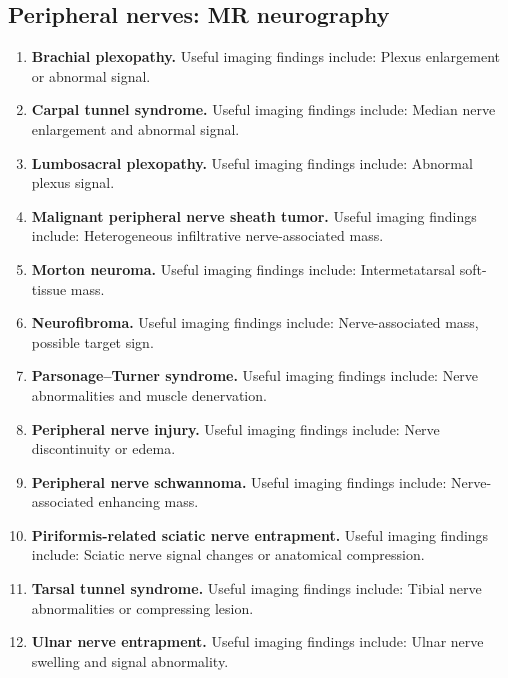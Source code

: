 \subsection{Peripheral nerves: MR neurography}
\begin{enumerate}[leftmargin=*,itemsep=0.45em,topsep=0.4em]
\item \textbf{Brachial plexopathy.} Useful imaging findings include: Plexus enlargement or abnormal signal.
\item \textbf{Carpal tunnel syndrome.} Useful imaging findings include: Median nerve enlargement and abnormal signal.
\item \textbf{Lumbosacral plexopathy.} Useful imaging findings include: Abnormal plexus signal.
\item \textbf{Malignant peripheral nerve sheath tumor.} Useful imaging findings include: Heterogeneous infiltrative nerve-associated mass.
\item \textbf{Morton neuroma.} Useful imaging findings include: Intermetatarsal soft-tissue mass.
\item \textbf{Neurofibroma.} Useful imaging findings include: Nerve-associated mass, possible target sign.
\item \textbf{Parsonage--Turner syndrome.} Useful imaging findings include: Nerve abnormalities and muscle denervation.
\item \textbf{Peripheral nerve injury.} Useful imaging findings include: Nerve discontinuity or edema.
\item \textbf{Peripheral nerve schwannoma.} Useful imaging findings include: Nerve-associated enhancing mass.
\item \textbf{Piriformis-related sciatic nerve entrapment.} Useful imaging findings include: Sciatic nerve signal changes or anatomical compression.
\item \textbf{Tarsal tunnel syndrome.} Useful imaging findings include: Tibial nerve abnormalities or compressing lesion.
\item \textbf{Ulnar nerve entrapment.} Useful imaging findings include: Ulnar nerve swelling and signal abnormality.
\end{enumerate}

